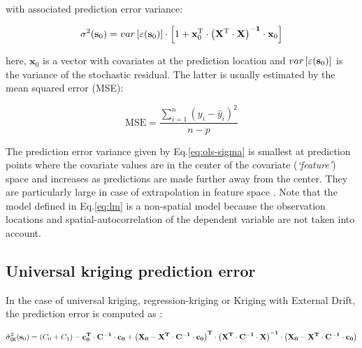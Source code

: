 \documentclass[11pt]{krantz}
\theoremstyle{definition}
\theoremstyle{definition}
\theoremstyle{definition}
\theoremstyle{remark}
\begin{document}
with associated prediction error variance:

\begin{equation}
\sigma ^2 ({\bf s}_0 ) = var\left[ \varepsilon ({\bf s}_0) \right] \cdot \left[ {1 +
{\mathbf x}_0^{\rm T}  \cdot \left(
{{\mathbf X}^{\rm T}  \cdot {\mathbf X}} \right)^{ -
{\mathbf 1}}  \cdot {\mathbf x}_0 } \right]
\label{eq:ols-sigma}
\end{equation}

here, \({\mathbf x}_0\) is a vector with covariates at the prediction
location and \(var\left[ \varepsilon ({\bf s}_0) \right]\) is the
variance of the stochastic residual. The latter is usually estimated by
the mean squared error (MSE):

\begin{equation}
{\mathrm{MSE}} = \frac{\sum\limits_{i = 1}^n {(y_i - \hat y_i)^2}}{n-p}
\end{equation}

The prediction error variance given by Eq.\eqref{eq:ols-sigma} is smallest
at prediction points where the covariate values are in the center of the
covariate (\emph{`feature'}) space and increases as predictions are made
further away from the center. They are particularly large in case of
extrapolation in feature space \citep{Kutner2004McGraw}. Note that the
model defined in Eq.\eqref{eq:lm} is a non-spatial model because the
observation locations and spatial-autocorrelation of the dependent
variable are not taken into account.

\hypertarget{universal-kriging-prediction-error}{%
\subsection{Universal kriging prediction
error}\label{universal-kriging-prediction-error}}

In the case of universal kriging, regression-kriging or Kriging with
External Drift, the prediction error is computed as
\citep{Christensen2001Springer}:

\begin{equation}
\hat \sigma _{\tt{UK}}^2 ({\bf{s}}_0 )  = (C_0  + C_1 ) - {\bf{c}}_{\bf{0}}^{\bf{T}}  \cdot {\bf{C}}^{ - {\bf{1}}}  \cdot
{\bf{c}}_{\bf{0}} + \left( {{\bf{X}}_{\bf{0}}  -
{\bf{X}}^{\bf{T}} \cdot {\bf{C}}^{ - {\bf{1}}} \cdot
{\bf{c}}_{\bf{0}} } \right)^{\bf{T}}  \cdot \left( {{\bf{X}}^{\bf{T}}
\cdot {\bf{C}}^{ - {\bf{1}}} \cdot {\bf{X}}} \right)^{{\bf{ - 1}}} \cdot \left( {{\bf{X}}_{\bf{0}}  - {\bf{X}}^{\bf{T}}  \cdot
{\bf{C}}^{ - {\bf{1}}} \cdot {\bf{c}}_{\bf{0}} } \right)
\label{eq:UKvar}
\end{equation}
\end{document}
